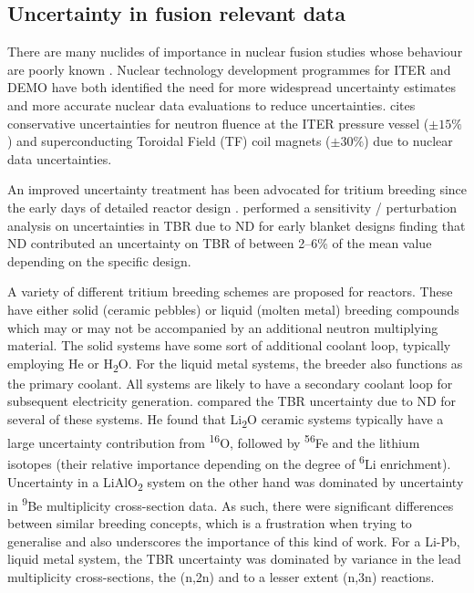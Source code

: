 \subsection{Uncertainty in fusion relevant data}
There are many nuclides of importance in nuclear fusion studies whose behaviour are poorly known \cite{Forrest2011}. Nuclear technology development programmes for ITER \cite{Batistoni2008} and DEMO \cite{Abdou2015} have both identified the need for more widespread uncertainty estimates and more accurate nuclear data evaluations to reduce uncertainties. \citeauthor{Batistoni2008} cites conservative uncertainties for neutron fluence at the ITER pressure vessel ($\pm 15\%$) and superconducting Toroidal Field (TF) coil magnets ($\pm 30\%$) due to nuclear data uncertainties. 

An improved uncertainty treatment has been advocated for tritium breeding since the early days of detailed reactor design \cite{Abdou1986}. \citeauthor{Youssef1986} performed a sensitivity / perturbation analysis on uncertainties in TBR due to ND for early blanket designs finding that ND contributed an uncertainty on TBR of between 2--6\% of the mean value depending on the specific design. 

A variety of different tritium breeding schemes are proposed for reactors. These have either solid (ceramic pebbles) or liquid (molten metal) breeding compounds which may or may not be accompanied by an additional neutron multiplying material. The solid systems have some sort of additional coolant loop, typically employing He or H\textsubscript{2}O. For the liquid metal systems, the breeder also functions as the primary coolant. All systems are likely to have a secondary coolant loop for subsequent electricity generation. \citeauthor{Youssef1986} compared the TBR uncertainty due to ND for several of these systems. He found that Li\textsubscript{2}O ceramic systems typically have a large uncertainty contribution from \textsuperscript{16}O, followed by \textsuperscript{56}Fe and the lithium isotopes (their relative importance depending on the degree of \textsuperscript{6}Li enrichment). Uncertainty in a LiAlO\textsubscript{2} system on the other hand was dominated by uncertainty in \textsuperscript{9}Be multiplicity cross-section data. As such, there were significant differences between similar breeding concepts, which is a frustration when trying to generalise and also underscores the importance of this kind of work. For a Li-Pb, liquid metal system, the TBR uncertainty was dominated by variance in the lead multiplicity cross-sections, the (n,2n) and to a lesser extent (n,3n) reactions.

